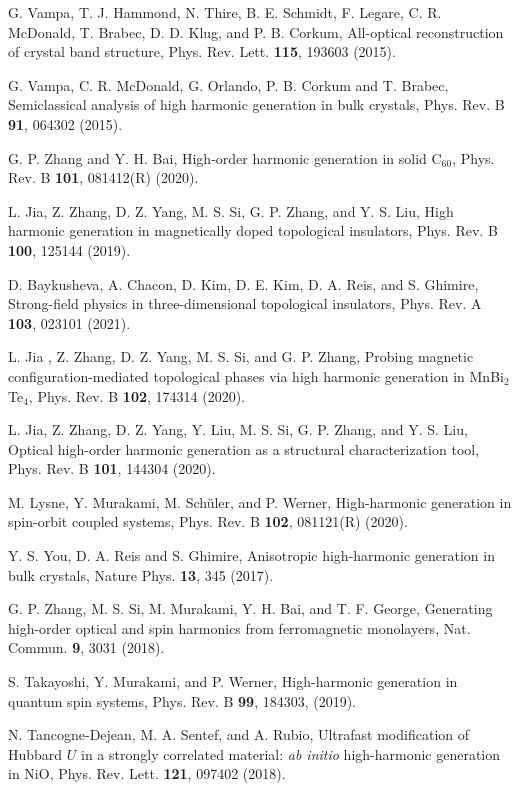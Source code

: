 \documentclass[checkin,showpacs,psfig,aps,pra]{revtex4}
\begin{document}
\begin{thebibliography}{99}
G. Vampa, T. J. Hammond, N. Thire, B. E. Schmidt,
F. Legare, C. R. McDonald, T. Brabec, D. D. Klug, and P. B. Corkum,
{All-optical reconstruction of crystal band structure},
Phys. Rev. Lett.  {\bf 115}, 193603 (2015).

 G. Vampa, C. R. McDonald, G. Orlando, P. B. Corkum
and T. Brabec, {Semiclassical analysis of high harmonic generation
in bulk crystals}, Phys. Rev. B {\bf 91}, 064302 (2015).

 G. P. Zhang and Y. H. Bai, {High-order harmonic
generation in solid C$_{60}$}, Phys. Rev. B {\bf 101}, 081412(R)
(2020).

 L. Jia, Z. Zhang, D. Z. Yang, M. S. Si, G. P. Zhang,
and Y. S. Liu, {High harmonic generation in magnetically doped
topological insulators}, Phys. Rev. B {\bf 100}, 125144 (2019).

D. Baykusheva, A. Chacon, D. Kim, D. E. Kim,
D.  A. Reis, and S. Ghimire, {Strong-field physics in
three-dimensional topological insulators}, Phys. Rev. A {\bf 103},
023101 (2021).

 L. Jia , Z. Zhang, D. Z. Yang, M. S. Si, and
G. P. Zhang, {Probing magnetic configuration-mediated topological
phases via high harmonic generation in MnBi$_2$Te$_4$},
Phys. Rev. B {\bf 102}, 174314 (2020).

 L. Jia, Z. Zhang, D. Z. Yang, Y. Liu, M. S. Si,
G. P. Zhang, and Y. S. Liu, {Optical high-order harmonic generation
as a structural characterization tool}, Phys. Rev. B {\bf 101},
144304 (2020).

M. Lysne, Y. Murakami, M. Sch\"uler, and P. Werner,
{High-harmonic generation in spin-orbit coupled systems},
Phys. Rev. B {\bf 102}, 081121(R) (2020).

 Y. S. You, D. A. Reis and S. Ghimire, {Anisotropic
high-harmonic generation in bulk crystals}, Nature Phys. {\bf 13}, 345
(2017).

G. P. Zhang, M. S. Si, M. Murakami, Y. H. Bai, and  T.
F. George, {Generating high-order optical and spin harmonics
from ferromagnetic monolayers}, Nat. Commun. {\bf 9}, 3031 (2018).

S. Takayoshi, Y. Murakami, and P. Werner,
{High-harmonic generation in quantum spin systems}, Phys. Rev. B
{\bf 99}, 184303, (2019).

 N. Tancogne-Dejean, M. A. Sentef, and
A. Rubio, {Ultrafast modification of Hubbard $U$ in a strongly
correlated material: {\it ab initio} high-harmonic generation in
NiO},  Phys. Rev. Lett. {\bf 121}, 097402 (2018).


\end{thebibliography}
\end{document}
